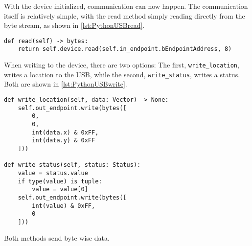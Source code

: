 

With the device initialized, communication can now happen.
The communication itself is relatively simple, with the read method simply reading directly from the byte stream, as shown in \autoref{lst:PythonUSBread}.

\begin{lstlisting}[label={lst:PythonUSBread},caption={Reading from the USB port connected to the NXT}]
def read(self) -> bytes:
    return self.device.read(self.in_endpoint.bEndpointAddress, 8)
\end{lstlisting}

When writing to the device, there are two options:
The first, \texttt{write\_location}, writes a location to the USB, while the second, \texttt{write\_status}, writes a status.
Both are shown in \autoref{lst:PythonUSBwrite}.

\begin{lstlisting}[label={lst:PythonUSBwrite},caption={Writing to the USB port connected to the NXT}]
def write_location(self, data: Vector) -> None:
    self.out_endpoint.write(bytes([
        0,
        0,
        int(data.x) & 0xFF,
        int(data.y) & 0xFF
    ]))

def write_status(self, status: Status):
    value = status.value
    if type(value) is tuple:
        value = value[0]
    self.out_endpoint.write(bytes([
        int(value) & 0xFF,
        0
    ]))
\end{lstlisting}

Both methods send byte wise data.
